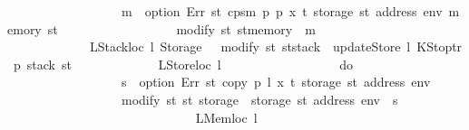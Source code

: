 \begin{isabellebody}
\ \ \ \ \ \ \ \ \ \ \ \ \ \ \ \ \ \ m\ {\isasymleftarrow}\ option\ Err\ {\isacharparenleft}{\kern0pt}{\isasymlambda}st{\isachardot}{\kern0pt}\ cps{}m\ p\ p{\isacharprime}{\kern0pt}\ x\ t\ {\isacharparenleft}{\kern0pt}storage\ st\ {\isacharparenleft}{\kern0pt}address\ env{\isacharparenright}{\kern0pt}{\isacharparenright}{\kern0pt}\ {\isacharparenleft}{\kern0pt}memory\ st{\isacharparenright}{\kern0pt}{\isacharparenright}{\kern0pt}{\isacharsemicolon}{\kern0pt}\isanewline
\ \ \ \ \ \ \ \ \ \ \ \ \ \ \ \ \ \ modify\ {\isacharparenleft}{\kern0pt}{\isasymlambda}st{\isachardot}{\kern0pt}\ st{\isasymlparr}memory\ {\isacharcolon}{\kern0pt}{\isacharequal}{\kern0pt}\ m{\isasymrparr}{\isacharparenright}{\kern0pt}\isanewline
\ \ \ \ \ \ \ \ \ \ \ \ \ \ \ \ {\isacharbraceright}{\kern0pt}\isanewline
\ \ \ \ \ \ \ \ \ \ \ \ {\isacharbar}{\kern0pt}\ {\isacharparenleft}{\kern0pt}LStackloc\ l{\isacharcomma}{\kern0pt}\ Storage\ {\isacharunderscore}{\kern0pt}{\isacharparenright}{\kern0pt}\ {\isasymRightarrow}\ modify\ {\isacharparenleft}{\kern0pt}{\isasymlambda}st{\isachardot}{\kern0pt}\ st{\isasymlparr}stack\ {\isacharcolon}{\kern0pt}{\isacharequal}{\kern0pt}\ updateStore\ l\ {\isacharparenleft}{\kern0pt}KStoptr\ p{\isacharparenright}{\kern0pt}\ {\isacharparenleft}{\kern0pt}stack\ st{\isacharparenright}{\kern0pt}{\isasymrparr}{\isacharparenright}{\kern0pt}\isanewline
\ \ \ \ \ \ \ \ \ \ \ \ {\isacharbar}{\kern0pt}\ {\isacharparenleft}{\kern0pt}LStoreloc\ l{\isacharcomma}{\kern0pt}\ {\isacharunderscore}{\kern0pt}{\isacharparenright}{\kern0pt}\ {\isasymRightarrow}\isanewline
\ \ \ \ \ \ \ \ \ \ \ \ \ \ \ \ do\ {\isacharbraceleft}{\kern0pt}\isanewline
\ \ \ \ \ \ \ \ \ \ \ \ \ \ \ \ \ \ s\ {\isasymleftarrow}\ option\ Err\ {\isacharparenleft}{\kern0pt}{\isasymlambda}st{\isachardot}{\kern0pt}\ copy\ p\ l\ x\ t\ {\isacharparenleft}{\kern0pt}storage\ st\ {\isacharparenleft}{\kern0pt}address\ env{\isacharparenright}{\kern0pt}{\isacharparenright}{\kern0pt}{\isacharparenright}{\kern0pt}{\isacharsemicolon}{\kern0pt}\isanewline
\ \ \ \ \ \ \ \ \ \ \ \ \ \ \ \ \ \ modify\ {\isacharparenleft}{\kern0pt}{\isasymlambda}st{\isachardot}{\kern0pt}\ st\ {\isasymlparr}storage\ {\isacharcolon}{\kern0pt}{\isacharequal}{\kern0pt}\ {\isacharparenleft}{\kern0pt}storage\ st{\isacharparenright}{\kern0pt}\ {\isacharparenleft}{\kern0pt}address\ env\ {\isacharcolon}{\kern0pt}{\isacharequal}{\kern0pt}\ s{\isacharparenright}{\kern0pt}{\isasymrparr}{\isacharparenright}{\kern0pt}\isanewline
\ \ \ \ \ \ \ \ \ \ \ \ \ \ \ \ {\isacharbraceright}{\kern0pt}\isanewline
\ \ \ \ \ \ \ \ \ \ \ \ {\isacharbar}{\kern0pt}\ {\isacharparenleft}{\kern0pt}LMemloc\ l{\isacharcomma}{\kern0pt}\ {\isacharunderscore}{\kern0pt}{\isacharparenright}{\kern0pt}\ {\isasymRightarrow}\isanewline

\end{isabellebody}
